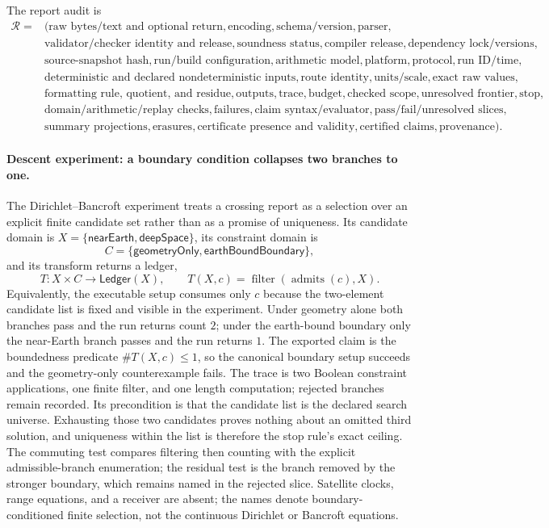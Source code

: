 The report audit is
\[
\begin{aligned}
\mathcal R={}&(\text{raw bytes/text and optional return},\text{encoding},\text{schema/version},\text{parser},\\
&\text{validator/checker identity and release},\text{soundness status},\text{compiler release},
\text{dependency lock/versions},\\
&\text{source-snapshot hash},\text{run/build configuration},\text{arithmetic model},\text{platform},
\text{protocol},\text{run ID/time},\\
&\text{deterministic and declared nondeterministic inputs},\text{route identity},\text{units/scale},
\text{exact raw values},\\
&\text{formatting rule, quotient, and residue},\text{outputs},\text{trace},\text{budget},
\text{checked scope},\text{unresolved frontier},\text{stop},\\
&\text{domain/arithmetic/replay checks},\text{failures},\text{claim syntax/evaluator},
\text{pass/fail/unresolved slices},\\
&\text{summary projections},\text{erasures},\text{certificate presence and validity},
\text{certified claims},\text{provenance}).
\end{aligned}
\]

\paragraph{Descent experiment: a boundary condition collapses two branches to one.}
The Dirichlet--Bancroft experiment treats a crossing report as a selection over an explicit finite candidate set rather than as a promise of uniqueness.
Its candidate domain is \(X=\{\mathsf{nearEarth},\mathsf{deepSpace}\}\), its constraint domain is
\[
 C=\{\mathsf{geometryOnly},\mathsf{earthBoundBoundary}\},
\]
and its transform returns a ledger,
\[
 T:X\times C\longrightarrow\mathsf{Ledger}(X),
 \qquad
 T(X,c)=\operatorname{filter}(\operatorname{admits}(c),X).
\]
Equivalently, the executable setup consumes only \(c\) because the two-element candidate list is fixed and visible in the experiment.
Under geometry alone both branches pass and the run returns count \(2\); under the earth-bound boundary only the near-Earth branch passes and the run returns \(1\).
The exported claim is the boundedness predicate \(\#T(X,c)\le1\), so the canonical boundary setup succeeds and the geometry-only counterexample fails.
The trace is two Boolean constraint applications, one finite filter, and one length computation; rejected branches
remain recorded.
Its precondition is that the candidate list is the declared search universe.
Exhausting those two candidates proves nothing about an omitted third solution, and uniqueness within the list is therefore the stop rule's exact ceiling.
The commuting test compares filtering then counting with the explicit admissible-branch enumeration; the residual test is the branch removed by the stronger boundary, which remains named in the rejected slice.
Satellite clocks, range equations, and a receiver are absent; the names denote boundary-conditioned finite selection,
not the continuous Dirichlet or Bancroft equations.

